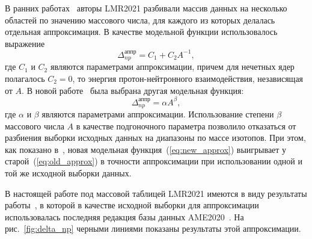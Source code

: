 В ранних работах~\cite{vladimirova2021-1, vladimirova2021-2} авторы LMR2021 разбивали массив данных на несколько областей по значению массового числа, для каждого из которых делалась отдельная аппроксимация. В качестве модельной функции использовалось выражение
\begin{equation}
\Delta^\text{аппр}_{np} = C_1 + C_2 A^{-1},
\label{eq:old_approx}
\end{equation}
где $C_1$ и $C_2$ являются параметрами аппроксимации, причем для нечетных ядер полагалось $C_2 = 0$, то энергия протон-нейтронного взаимодействия, независящая от $A$. В новой работе~\cite{vladimirova2022} была выбрана другая модельная функция:
\begin{equation}
\Delta^\text{аппр}_{np} = \alpha A^{\beta},
\label{eq:new_approx}
\end{equation}
где $\alpha$ и $\beta$ являются параметрами аппроксимации. Использование степени $\beta$ массового числа $A$ в качестве подгоночного параметра позволило отказаться от разбиения выборки исходных данных на диапазоны по массе изотопов. При этом, как показано в~\cite{vladimirova2022}, новая модельная функция~(\ref{eq:new_approx}) выигрывает у старой~(\ref{eq:old_approx}) в точности аппроксимации при использовании одной и той же исходной выборки данных.

В настоящей работе под массовой таблицей LMR2021 имеются в виду результаты работы~\cite{vladimirova2022}, в которой в качестве исходной выборки для аппроксимации использовалась последняя редакция базы данных AME2020~\cite{huang2021}. На рис.~\ref{fig:delta_np} черными линиями показаны результаты этой аппроксимации.


